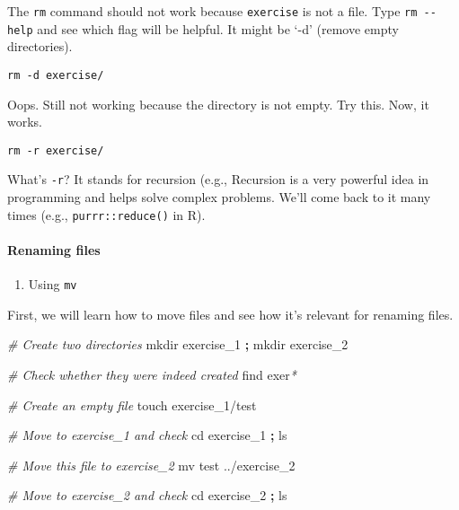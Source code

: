 \documentclass[
]{book}
\newenvironment{Shaded}{\begin{snugshade}}{\end{snugshade}}
\newcommand{\BuiltInTok}[1]{#1}
\newcommand{\CommentTok}[1]{\textcolor[rgb]{0.56,0.35,0.01}{\textit{#1}}}
\newcommand{\FunctionTok}[1]{\textcolor[rgb]{0.00,0.00,0.00}{#1}}
\newcommand{\KeywordTok}[1]{\textcolor[rgb]{0.13,0.29,0.53}{\textbf{#1}}}
\newcommand{\NormalTok}[1]{#1}
\newcommand{\PreprocessorTok}[1]{\textcolor[rgb]{0.56,0.35,0.01}{\textit{#1}}}
\providecommand{\tightlist}{%
  \setlength{\itemsep}{0pt}\setlength{\parskip}{0pt}}
\begin{document}
The \texttt{rm} command should not work because \texttt{exercise} is not a file. Type \texttt{rm\ -\/-help} and see which flag will be helpful. It might be `-d' (remove empty directories).

\begin{verbatim}
rm -d exercise/  
\end{verbatim}

Oops. Still not working because the directory is not empty. Try this. Now, it works.

\begin{verbatim}
rm -r exercise/ 
\end{verbatim}

What's \texttt{-r}? It stands for recursion (e.g., Recursion is a very powerful idea in programming and helps solve complex problems. We'll come back to it many times (e.g., \texttt{purrr::reduce()} in R).

\hypertarget{renaming-files}{%
\paragraph{Renaming files}\label{renaming-files}}

\begin{enumerate}
\def\labelenumi{\arabic{enumi}.}
\tightlist
\item
  Using \texttt{mv}
\end{enumerate}

First, we will learn how to move files and see how it's relevant for renaming files.

\begin{Shaded}
\begin{Highlighting}[]

\CommentTok{\# Create two directories }
\FunctionTok{mkdir}\NormalTok{ exercise\_1 }\KeywordTok{;} \FunctionTok{mkdir}\NormalTok{ exercise\_2 }

\CommentTok{\# Check whether they were indeed created }
\FunctionTok{find}\NormalTok{ exer}\PreprocessorTok{*}

\CommentTok{\# Create an empty file }
\FunctionTok{touch}\NormalTok{ exercise\_1/test }

\CommentTok{\# Move to exercise\_1 and check }
\BuiltInTok{cd}\NormalTok{ exercise\_1 }\KeywordTok{;} \FunctionTok{ls} 

\CommentTok{\# Move this file to exercise\_2 }
\FunctionTok{mv}\NormalTok{ test ../exercise\_2 }

\CommentTok{\# Move to exercise\_2 and check }
\BuiltInTok{cd}\NormalTok{ exercise\_2 }\KeywordTok{;} \FunctionTok{ls} 
\end{Highlighting}
\end{Shaded}
\end{document}
